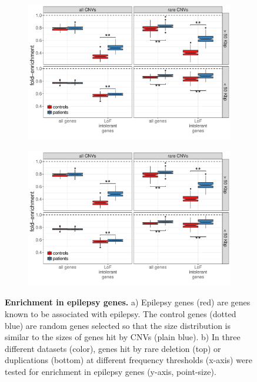 \begin{figure}[htp]
  \centering
  \begin{subfigure}[b]{.7\textwidth}
    \includegraphics[width=\linewidth,page=10]{figures/epilepsy-enrichmentPatterns.pdf}
    \caption{}
    \label{fig:epigenesize}
  \end{subfigure}
  \begin{subfigure}[b]{.7\textwidth}
    \includegraphics[width=\linewidth,page=12]{figures/epilepsy-enrichmentPatterns.pdf}
    \caption{}
    \label{fig:epicnvex}
  \end{subfigure}

  \caption[Enrichment in epilepsy genes.]{{\bf Enrichment in epilepsy genes.} {\small a) Epilepsy genes (red) are genes known to be associated with epilepsy. The control genes (dotted blue) are random genes selected so that the size distribution is similar to the sizes of genes hit by CNVs (plain blue). b) In three different datasets (color), genes hit by rare deletion (top) or duplications (bottom) at different frequency thresholds (x-axis) were tested for enrichment in epilepsy genes (y-axis, point-size).}}
\end{figure}

